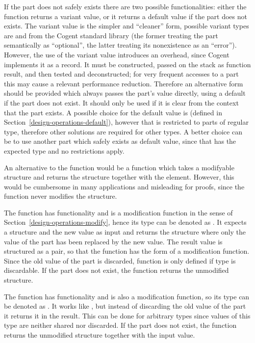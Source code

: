 If the part does not safely exists there are two possible functionalities: either the function returns a variant
value, or it returns a default value if the part does not exists. The variant value is the simpler and ``cleaner''
form, possible variant types are  and  from the Cogent standard library (the former treating
the part semantically as ``optional'', the latter treating its nonexistence as an ``error''). However, the use
of the variant value introduces an overhead, since Cogent implements it as a record. It must be constructed, passed
on the stack as function result, and then tested and deconstructed; for very frequent accesses to a part this may
cause a relevant performance reduction. Therefore an alternative form should be provided which always passes the
part's value directly, using a default if the part does not exist. It should only be used if it is clear from the
context that the part exists. A possible choice for the default value is  (defined in 
Section~\ref{design-operations-default}), however that is restricted to parts of regular type, therefore other 
solutions are required for other types. A better choice can be to use another part which safely exists as default 
value, since that has the expected type and no restrictions apply.

An alternative to the function  would be a function which takes a modifyable structure and returns the structure
together with the element. However, this would be cumbersome in many applications and misleading for proofs, since 
the function never modifies the structure. 

The function  has functionality  and is a modification function in the sense of 
Section~\ref{design-operations-modify}, hence its type can be denoted as . 
It expects a structure and the new value as input
and returns the structure where only the value of the part has been replaced by the new value. The result value is 
structured as a pair, so that the function has the form of a modification function. Since the old
value of the part is discarded, function  is only defined if type  is discardable.
If the part does not exist, the function returns the unmodified structure.

The function  has functionality  and is also a modification function, so its type
can be denoted as . It works like , but instead of
discarding the old value of the part it returns it in the result. This can be done for arbitrary types 
since values of this type are neither shared nor discarded. If the part does not exist, the function returns
the unmodified structure together with the input value.

